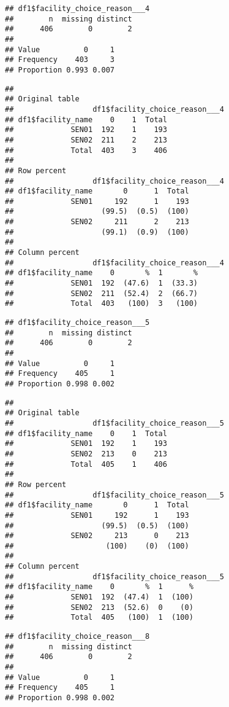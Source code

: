 \documentclass[
]{article}
\begin{document}
\begin{verbatim}
## df1$facility_choice_reason___4 
##        n  missing distinct 
##      406        0        2 
##                       
## Value          0     1
## Frequency    403     3
## Proportion 0.993 0.007
\end{verbatim}

\begin{verbatim}
## 
## Original table 
##                  df1$facility_choice_reason___4
## df1$facility_name    0    1  Total
##             SEN01  192    1    193
##             SEN02  211    2    213
##             Total  403    3    406
## 
## Row percent 
##                  df1$facility_choice_reason___4
## df1$facility_name       0      1  Total
##             SEN01     192      1    193
##                    (99.5)  (0.5)  (100)
##             SEN02     211      2    213
##                    (99.1)  (0.9)  (100)
## 
## Column percent 
##                  df1$facility_choice_reason___4
## df1$facility_name    0       %  1       %
##             SEN01  192  (47.6)  1  (33.3)
##             SEN02  211  (52.4)  2  (66.7)
##             Total  403   (100)  3   (100)
\end{verbatim}

\begin{verbatim}
## df1$facility_choice_reason___5 
##        n  missing distinct 
##      406        0        2 
##                       
## Value          0     1
## Frequency    405     1
## Proportion 0.998 0.002
\end{verbatim}

\begin{verbatim}
## 
## Original table 
##                  df1$facility_choice_reason___5
## df1$facility_name    0    1  Total
##             SEN01  192    1    193
##             SEN02  213    0    213
##             Total  405    1    406
## 
## Row percent 
##                  df1$facility_choice_reason___5
## df1$facility_name       0      1  Total
##             SEN01     192      1    193
##                    (99.5)  (0.5)  (100)
##             SEN02     213      0    213
##                     (100)    (0)  (100)
## 
## Column percent 
##                  df1$facility_choice_reason___5
## df1$facility_name    0       %  1      %
##             SEN01  192  (47.4)  1  (100)
##             SEN02  213  (52.6)  0    (0)
##             Total  405   (100)  1  (100)
\end{verbatim}

\begin{verbatim}
## df1$facility_choice_reason___8 
##        n  missing distinct 
##      406        0        2 
##                       
## Value          0     1
## Frequency    405     1
## Proportion 0.998 0.002
\end{verbatim}
\end{document}
